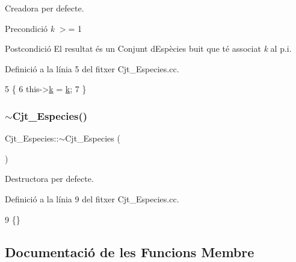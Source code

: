 Creadora per defecte. 

\begin{DoxyPrecond}{Precondició}
{\itshape k} $>$= 1 
\end{DoxyPrecond}
\begin{DoxyPostcond}{Postcondició}
El resultat és un Conjunt d\textquotesingle{}Espècies buit que té associat {\itshape k} al p.\+i. 
\end{DoxyPostcond}


Definició a la línia 5 del fitxer Cjt\+\_\+\+Especies.\+cc.


\begin{DoxyCode}
5                                 \{
6     this->\hyperlink{class_cjt___especies_a4586fb4724b7af4b7f00bb0c0bdd6a17}{k} = \hyperlink{class_cjt___especies_a4586fb4724b7af4b7f00bb0c0bdd6a17}{k};
7 \}
\end{DoxyCode}
\mbox{\label{class_cjt___especies_a1ca01609e28327635b4c1d4eb5baea5d}} 
\subsubsection{\texorpdfstring{$\sim$\+Cjt\+\_\+\+Especies()}{~Cjt\_Especies()}}
{\footnotesize\ttfamily Cjt\+\_\+\+Especies\+::$\sim$\+Cjt\+\_\+\+Especies (\begin{DoxyParamCaption}{ }\end{DoxyParamCaption})}



Destructora per defecte. 



Definició a la línia 9 del fitxer Cjt\+\_\+\+Especies.\+cc.


\begin{DoxyCode}
9 \{\}
\end{DoxyCode}


\subsection{Documentació de les Funcions Membre}
\mbox{\label{class_cjt___especies_a9437508ef6176d867e0bb7fbf4ba3106}} 
